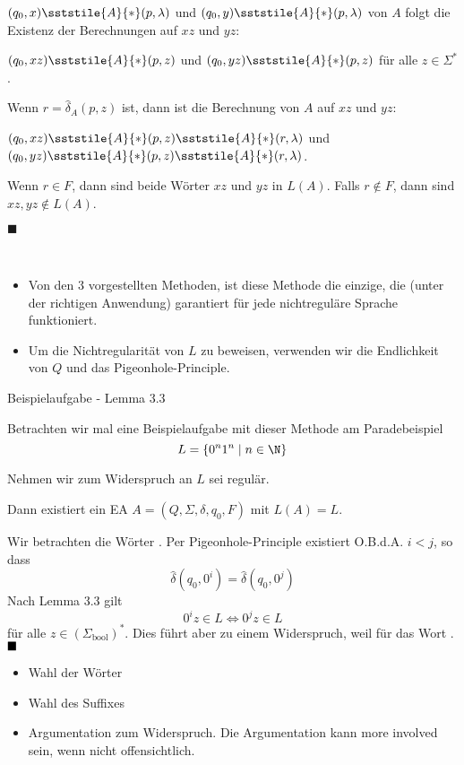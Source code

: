     $(q_0, x) \sststile{A}{*} (p, \lambda)$ und $(q_0, y) \sststile{A}{*} (p, \lambda)$
    von $A$ folgt die Existenz der Berechnungen auf $xz$ und $yz$:

    $(q_0, xz) \sststile{A}{*} (p, z)$ und $(q_0, yz) \sststile{A}{*} (p, z)$ für alle $z \in \Sigma^*$.

    Wenn $r = \hat{\delta}_A(p, z)$ ist, dann ist die Berechnung von $A$ auf $xz$ und $yz$:

    $(q_0, xz) \sststile{A}{*} (p, z) \sststile{A}{*} (r, \lambda)$ und $(q_0, yz) \sststile{A}{*} (p, z) \sststile{A}{*} (r, \lambda)$.

    Wenn $r \in F$, dann sind beide Wörter $xz$ und $yz$ in $L(A)$. Falls $r \notin F$, dann sind $xz, yz \notin L(A)$.

    \hspace*{0pt}\hfill$\blacksquare$

    \\
    \begin{itemize}[label=-]
        \item Von den 3 vorgestellten Methoden, ist diese Methode die einzige, die (unter der richtigen Anwendung) garantiert für jede nichtreguläre Sprache funktioniert.
        \item Um die Nichtregularität von $L$ zu beweisen, verwenden wir die Endlichkeit von $Q$ und das Pigeonhole-Principle.
    \end{itemize}

    \begin{subbox}{Beispielaufgabe - Lemma 3.3}

    Betrachten wir mal eine Beispielaufgabe mit dieser Methode am Paradebeispiel $$L = \{0^n1^n \mid n \in \N\}$$
    \end{subbox}

    Nehmen wir zum Widerspruch an $L$ sei regulär.

    Dann existiert ein EA $A = (Q, \Sigma, \delta, q_0, F)$ mit $L(A) = L$.

    Wir betrachten die Wörter . Per Pigeonhole-Principle existiert O.B.d.A. $i < j$, so dass 
    $$\hat{\delta}(q_0, 0^i) = \hat{\delta}(q_0, 0^{j})$$ 
    Nach Lemma 3.3 gilt
    $$0^iz \in L \iff 0^jz \in L$$
    für alle $z \in (\Sigma_{\text{bool}})^*$. Dies führt aber zu einem Widerspruch, weil für  das Wort .
    \(\hfill\blacksquare\)

    \begin{itemize}
        \item Wahl der Wörter
        \item Wahl des Suffixes
        \item Argumentation zum Widerspruch. Die Argumentation kann more involved sein, wenn nicht offensichtlich.
    \end{itemize}


